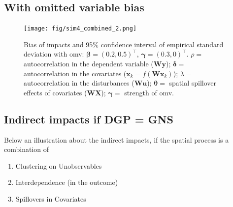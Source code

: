 \documentclass[
  letterpaper,
  DIV=11,
  numbers=noendperiod]{scrreprt}
\begin{document}
\hypertarget{with-omitted-variable-bias}{%
\subsection{With omitted variable
bias}\label{with-omitted-variable-bias}}

\begin{figure}

{\centering \texttt{[image: fig/sim4\_combined\_2.png]}

}

\caption{Bias of impacts and 95\% confidence interval of empirical
standard deviation with omv:
\({\boldsymbol{\mathbf{\beta}}}=(0.2, 0.5)^\intercal\),
\({\boldsymbol{\mathbf{\gamma}}}=(0.3, 0)^\intercal\). \(\rho=\)
autocorrelation in the dependent variable
(\(\boldsymbol{\mathbf{W}} \boldsymbol{\mathbf{y}}\));
\(\boldsymbol{\mathbf{\delta}}=\) autocorrelation in the covariates
(\(\boldsymbol{\mathbf{x}}_k = f(\boldsymbol{\mathbf{W}} \boldsymbol{\mathbf{x}}_k)\));
\(\lambda=\) autocorrelation in the disturbances
(\(\boldsymbol{\mathbf{W}} \boldsymbol{\mathbf{u}}\));
\(\boldsymbol{\mathbf{\theta}}=\) spatial spillover effects of
covariates (\(\boldsymbol{\mathbf{W}} \boldsymbol{\mathbf{X}}\));
\(\boldsymbol{\mathbf{\gamma}}=\) strength of omv.}

\end{figure}

\hypertarget{indirect-impacts-if-dgp-gns}{%
\subsection{Indirect impacts if DGP =
GNS}\label{indirect-impacts-if-dgp-gns}}

Below an illustration about the indirect impacts, if the spatial process
is a combination of

\begin{enumerate}
\def\labelenumi{\arabic{enumi})}
\item
  Clustering on Unobservables
\item
  Interdependence (in the outcome)
\item
  Spillovers in Covariates
\end{enumerate}
\end{document}
